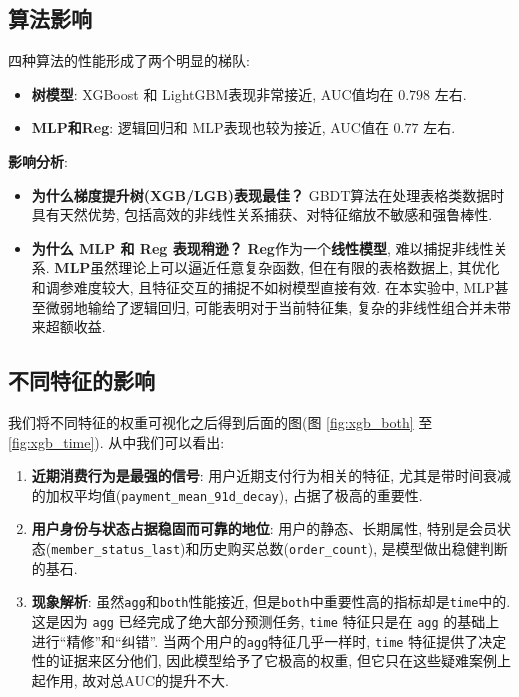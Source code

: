 \documentclass[11pt, a4paper]{article}
\begin{document}
\subsection{算法影响}
四种算法的性能形成了两个明显的梯队:
\begin{itemize}
    \item \textbf{树模型}: XGBoost 和 LightGBM表现非常接近, AUC值均在 $0.798$ 左右.
    \item \textbf{MLP和Reg}: 逻辑回归和 MLP表现也较为接近, AUC值在 $0.77$ 左右.
\end{itemize}

\textbf{影响分析}:
\begin{itemize}
    \item \textbf{为什么梯度提升树(XGB/LGB)表现最佳？} GBDT算法在处理表格类数据时具有天然优势, 包括高效的非线性关系捕获、对特征缩放不敏感和强鲁棒性.
    \item \textbf{为什么 MLP 和 Reg 表现稍逊？} \textbf{Reg}作为一个\textbf{线性模型}, 难以捕捉非线性关系. \textbf{MLP}虽然理论上可以逼近任意复杂函数, 但在有限的表格数据上, 其优化和调参难度较大, 且特征交互的捕捉不如树模型直接有效. 在本实验中, MLP甚至微弱地输给了逻辑回归, 可能表明对于当前特征集, 复杂的非线性组合并未带来超额收益.
\end{itemize}

\subsection{不同特征的影响}
我们将不同特征的权重可视化之后得到后面的图(图 \ref{fig:xgb_both} 至 \ref{fig:xgb_time}). 从中我们可以看出:
\begin{enumerate}
    \item \textbf{近期消费行为是最强的信号}: 用户近期支付行为相关的特征, 尤其是带时间衰减的加权平均值(\texttt{payment\_mean\_91d\_decay}), 占据了极高的重要性.
    \item \textbf{用户身份与状态占据稳固而可靠的地位}: 用户的静态、长期属性, 特别是会员状态(\texttt{member\_status\_last})和历史购买总数(\texttt{order\_count}), 是模型做出稳健判断的基石.
    \item \textbf{现象解析}: 虽然\texttt{agg}和\texttt{both}性能接近, 但是\texttt{both}中重要性高的指标却是\texttt{time}中的. 这是因为 \texttt{agg} 已经完成了绝大部分预测任务, \texttt{time} 特征只是在 \texttt{agg} 的基础上进行“精修”和“纠错”. 当两个用户的\texttt{agg}特征几乎一样时, \texttt{time} 特征提供了决定性的证据来区分他们, 因此模型给予了它极高的权重, 但它只在这些疑难案例上起作用, 故对总AUC的提升不大.
\end{enumerate}
\end{document}
